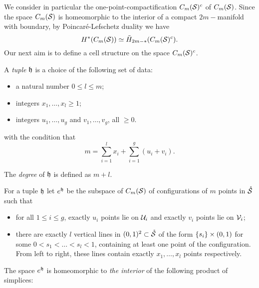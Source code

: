 We consider in particular the one-point-compactification $C_m(\mathcal{S})^c$ of $C_m(\mathcal{S})$.
Since the space $C_m(\mathcal{S})$ is homeomorphic to the interior of a compact
$2m-$manifold with boundary, by Poincaré-Lefschetz
duality we have
\[
 H^*(C_m(\mathcal{S}))\simeq \tilde H_{2m-*}(C_m(\mathcal{S})^c).
\]
Our next aim is to define a cell structure on the space $C_m(\mathcal{S})^c$.
\begin{defn}
\label{defn:ehopen}
A \emph{tuple} $\mathfrak{h}$ is a choice of the following set of data:
 \begin{itemize}
  \item a natural number $0\leq l\leq m$;
  \item integers $x_1,\dots,x_l\geq 1$;
  \item integers $u_1,\dots,u_g$ and $v_1,\dots,v_g$, all $\geq 0$.
 \end{itemize}
with the condition that
\[
 m=\sum_{i=1}^lx_i+\sum_{i=1}^g(u_i+v_i).
\]

The \emph{degree} of $\mathfrak{h}$ is defined as $m+l$.

For a tuple $\mathfrak{h}$ let $e^{\mathfrak{h}}$ be the subspace
of $C_m(\mathcal{S})$ of configurations of $m$ points in $\mathring{\mathcal{S}}$ such that
\begin{itemize}
 \item for all $1\leq i\leq g$, exactly $u_i$ points lie on $\mathcal{U}_i$
 and exactly $v_i$ points lie on $\mathcal{V}_i$;
 \item there are exactly $l$ vertical lines in $(0,1)^2\subset\mathring{\mathcal{S}}$ of the
 form $\left\{s_i\right\}\times(0,1)$ for some $0<s_1<\dots<s_l<1$, containing at least one
 point of the configuration. From left to right, these lines contain exactly $x_1,\dots,x_l$ points
 respectively.
\end{itemize}
\end{defn}
The space $e^{\mathfrak{h}}$ is homeomorphic to \emph{the interior} of the following product of simplices:

